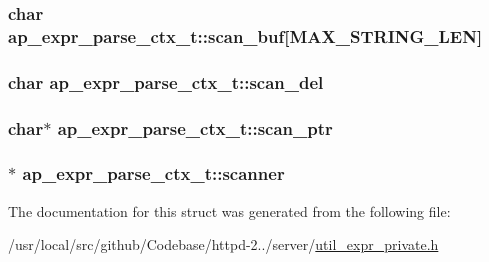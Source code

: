 \subsubsection[{\texorpdfstring{scan\+\_\+buf}{scan_buf}}]{\setlength{\rightskip}{0pt plus 5cm}char ap\+\_\+expr\+\_\+parse\+\_\+ctx\+\_\+t\+::scan\+\_\+buf\mbox{[}{\bf M\+A\+X\+\_\+\+S\+T\+R\+I\+N\+G\+\_\+\+L\+EN}\mbox{]}}\hypertarget{structap__expr__parse__ctx__t_a79a7db739f39f16c1f3aedb88d387045}{}\label{structap__expr__parse__ctx__t_a79a7db739f39f16c1f3aedb88d387045}
\subsubsection[{\texorpdfstring{scan\+\_\+del}{scan_del}}]{\setlength{\rightskip}{0pt plus 5cm}char ap\+\_\+expr\+\_\+parse\+\_\+ctx\+\_\+t\+::scan\+\_\+del}\hypertarget{structap__expr__parse__ctx__t_a8a5ae8fff5447c3c376d642009a2fcfd}{}\label{structap__expr__parse__ctx__t_a8a5ae8fff5447c3c376d642009a2fcfd}
\subsubsection[{\texorpdfstring{scan\+\_\+ptr}{scan_ptr}}]{\setlength{\rightskip}{0pt plus 5cm}char$\ast$ ap\+\_\+expr\+\_\+parse\+\_\+ctx\+\_\+t\+::scan\+\_\+ptr}\hypertarget{structap__expr__parse__ctx__t_a23bbb1f7ac81b894d419dec020ea789a}{}\label{structap__expr__parse__ctx__t_a23bbb1f7ac81b894d419dec020ea789a}
\subsubsection[{\texorpdfstring{scanner}{scanner}}]{$\ast$ ap\+\_\+expr\+\_\+parse\+\_\+ctx\+\_\+t\+::scanner}\hypertarget{structap__expr__parse__ctx__t_a9974c44bc1bb6a13436f31444a1a0495}{}\label{structap__expr__parse__ctx__t_a9974c44bc1bb6a13436f31444a1a0495}


The documentation for this struct was generated from the following file\+:\begin{DoxyCompactItemize}
\item 
/usr/local/src/github/\+Codebase/httpd-\/2../server/\hyperlink{util__expr__private_8h}{util\+\_\+expr\+\_\+private.\+h}\end{DoxyCompactItemize}
